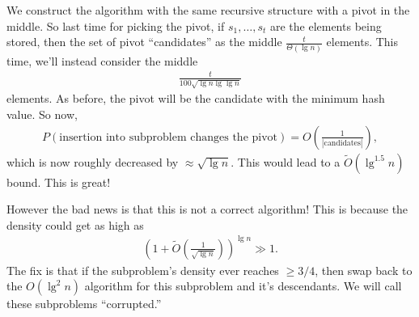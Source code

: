 \documentclass{report}
\begin{document}
\noindent We construct the algorithm with the same recursive structure with a pivot in the middle. So last time for picking the pivot, if $s_1, \ldots, s_t$ are the elements being stored, then the set of pivot ``candidates'' as the middle $\frac{t}{\Theta (\lg n)}$ elements. This time, we'll instead consider the middle 
\begin{align*}
    \frac{t}{100\sqrt{\lg n \lg\lg n}}
\end{align*}
elements. As before, the pivot will be the candidate with the minimum hash value. So now,
\begin{align*}
    P(\text{insertion into subproblem changes the pivot}) = O\left(\frac{1}{|\text{candidates}|}\right),
\end{align*}
which is now roughly decreased by $\approx \sqrt{\lg n}$. This would lead to a $\widetilde O(\lg^{1.5} n)$ bound. This is great!

\noindent However the bad news is that this is not a correct algorithm! This is because the density could get as high as 
\begin{align*}
    \left( 1 + \widetilde O\left(\frac{1}{\sqrt{\lg n}}\right)\right)^{\lg n} \gg 1.
\end{align*}
The fix is that if the subproblem's density ever reaches $\geq 3/4$, then swap back to the $O(\lg^2 n)$ algorithm for this subproblem and it's descendants. We will call these subproblems ``corrupted.''
\end{document}
